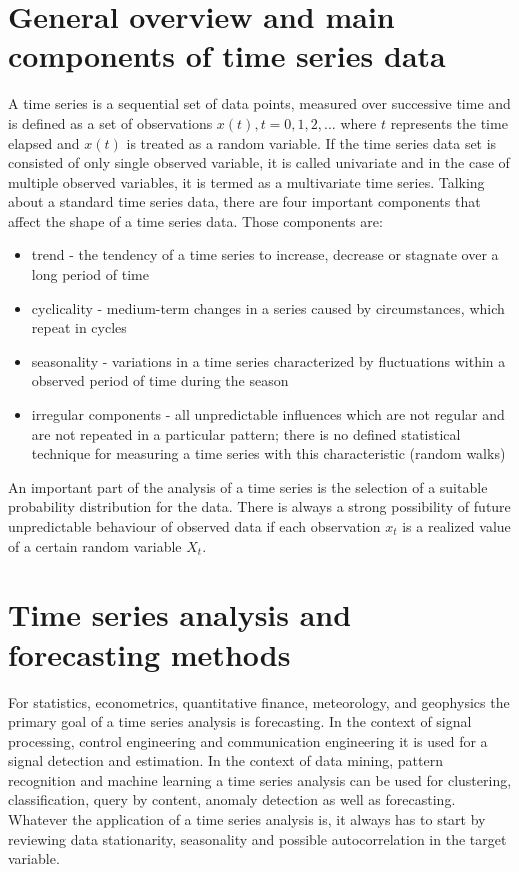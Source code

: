 \section{General overview and main components of time series data}
A time series is a sequential set of data points, measured over successive time and is defined as a set of observations $x(t), t = 0, 1, 2,...$ where $t$ represents the time elapsed and $x(t)$ is treated as a random variable.
If the time series data set is consisted of only single observed variable, it is called univariate and in the case of multiple observed variables, it is termed as a multivariate time series. 
Talking about a standard time series data, there are four important components that affect the shape of a time series data. Those components are: \cite{Adhikari_timeseries}
\begin{itemize}
    \item trend - the tendency of a time series to increase, decrease or stagnate over a long period of time
    \item cyclicality - medium-term changes in a series caused by circumstances, which repeat in cycles
    \item seasonality - variations in a time series characterized by fluctuations within a observed period of time during the season
    \item irregular components - all unpredictable influences which are not regular and are not repeated in a particular pattern; there is no defined statistical technique for measuring a time series with this characteristic (random walks) \cite{timeseries}
\end{itemize}

An important part of the analysis of a time series is the selection of a suitable probability distribution for the data. There is always a strong possibility of future unpredictable behaviour of observed data if each observation $x_{t}$ is a realized value of a certain random variable $X_{t}$.

\section{Time series analysis and forecasting methods}
For statistics, econometrics, quantitative finance, meteorology, and geophysics the primary goal of a time series analysis is forecasting. 
In the context of signal processing, control engineering and communication engineering it is used for a signal detection and estimation.
In the context of data mining, pattern recognition and machine learning a time series analysis can be used for clustering, classification, query by content, anomaly detection as well as forecasting.
Whatever the application of a time series analysis is, it always has to start by reviewing data stationarity, seasonality and possible autocorrelation in the target variable.

